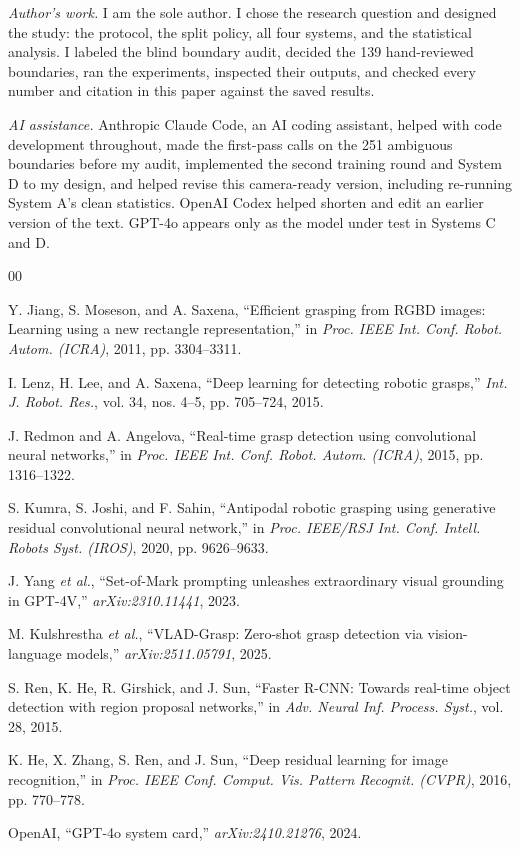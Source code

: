 \documentclass[10pt,conference,compsoc]{IEEEtran}
\begin{document}
\emph{Author's work.} I am the sole author. I chose the research question
and designed the study: the protocol, the split policy, all four systems, and
the statistical analysis. I labeled the blind boundary audit, decided the 139
hand-reviewed boundaries, ran the experiments, inspected their outputs, and
checked every number and citation in this paper against the saved results.

\emph{AI assistance.} Anthropic Claude Code, an AI coding assistant, helped
with code development throughout, made the first-pass calls on the 251
ambiguous boundaries before my audit, implemented the second training round
and System D to my design, and helped revise this camera-ready version,
including re-running System A's clean statistics. OpenAI Codex helped
shorten and edit an earlier version of the text. GPT-4o appears only as the
model under test in Systems C and D.

\balance
\begin{thebibliography}{00}

Y. Jiang, S. Moseson, and A. Saxena, ``Efficient grasping from RGBD images:
Learning using a new rectangle representation,'' in \emph{Proc. IEEE Int.
Conf. Robot. Autom. (ICRA)}, 2011, pp. 3304--3311.

I. Lenz, H. Lee, and A. Saxena, ``Deep learning for detecting robotic
grasps,'' \emph{Int. J. Robot. Res.}, vol. 34, nos. 4--5, pp. 705--724, 2015.

J. Redmon and A. Angelova, ``Real-time grasp detection using convolutional
neural networks,'' in \emph{Proc. IEEE Int. Conf. Robot. Autom. (ICRA)},
2015, pp. 1316--1322.

S. Kumra, S. Joshi, and F. Sahin, ``Antipodal robotic grasping using
generative residual convolutional neural network,'' in \emph{Proc. IEEE/RSJ
Int. Conf. Intell. Robots Syst. (IROS)}, 2020, pp. 9626--9633.

J. Yang \emph{et al.}, ``Set-of-Mark prompting unleashes extraordinary
visual grounding in GPT-4V,'' \emph{arXiv:2310.11441}, 2023.

M. Kulshrestha \emph{et al.}, ``VLAD-Grasp: Zero-shot grasp detection via
vision-language models,'' \emph{arXiv:2511.05791}, 2025.

S. Ren, K. He, R. Girshick, and J. Sun, ``Faster R-CNN: Towards real-time
object detection with region proposal networks,'' in \emph{Adv. Neural Inf.
Process. Syst.}, vol. 28, 2015.

K. He, X. Zhang, S. Ren, and J. Sun, ``Deep residual learning for image
recognition,'' in \emph{Proc. IEEE Conf. Comput. Vis. Pattern Recognit.
(CVPR)}, 2016, pp. 770--778.

OpenAI, ``GPT-4o system card,'' \emph{arXiv:2410.21276}, 2024.

\end{thebibliography}
\end{document}

